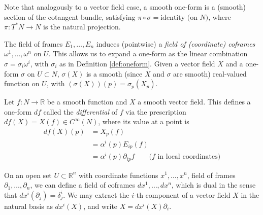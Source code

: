 \documentclass[psamsfonts]{amsart}
\theoremstyle{definition}
\theoremstyle{remark}
\newcommand*\R{\mathds{R}}
\numberwithin{equation}{section}
\begin{document}
Note that analogously to a vector field case, a smooth one-form is a (smooth) section of the cotangent bundle, satisfying $\pi \circ \sigma = \text{identity (on } N)$, where $\pi: T^*N \rightarrow N$ is the natural projection. 

The field of frames $E_1, \dots, E_n$ induces (pointwise) a \textit{field of (coordinate) coframes} $\omega^1, \dots, \omega^n$ on $U$. This allows us to expand a one-form as the linear combination $\sigma = \sigma_i\omega^i$, with $\sigma_i$ as in Definition \ref{def:oneform}. Given a vector field $X$ and a one-form $\sigma$ on $U\subset N$, $\sigma(X)$ is a smooth (since $X$ and $\sigma$ are smooth) real-valued function on $U$, with $(\sigma(X))(p) = \sigma_p(X_p)$. 

 Let $f: N \rightarrow \R$ be a smooth function and $X$ a smooth vector field. This defines a one-form $df$ called the \textit{differential} of $f$ via the prescription $df(X) = X(f) \in C^{\infty}(N)$, where its value at a point is
\begin{equation}\label{eq:differential1}
 \begin{aligned}
df(X)(p) &={} X_p(f) \\&={} \alpha^{i}(p)E_{ip}(f) \\
&={} \alpha^i(p)\partial_{ip}f\qquad \text{($f$ in local coordinates)}
 \end{aligned}
 \end{equation}

On an open set $U\subset \R^n$ with coordinate functions $x^1, \dots, x^n$, field of frames $\partial_1, \dots, \partial_n$, we can define a field of coframes $dx^1, \dots, dx^n$, which is dual in the sense that $dx^i(\partial_j) = \delta^i_j$. We may extract the $i$-th component of a vector field $X$ in the natural basis as $dx^i(X)$, and write $X = dx^i(X)\partial_i$. 
\end{document}
